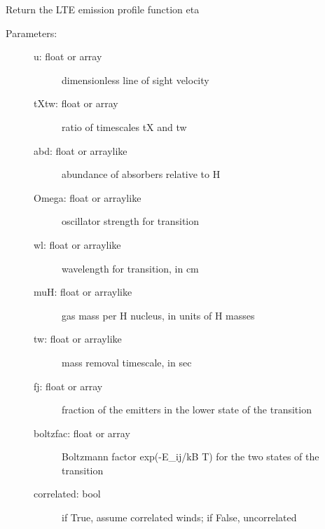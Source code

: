 \documentclass[letterpaper,10pt,english]{sphinxmanual}
\begin{document}
\begin{fulllineitems}
\begin{fulllineitems}
\begin{description}
\begin{description}
\end{description}

\end{description}

\end{fulllineitems}


\begin{fulllineitems}
\label{fulldoc:despotic.winds.pwind.eta}
Return the LTE emission profile function eta
\begin{description}
\item[{Parameters:}] \leavevmode\begin{description}
\item[{u: float or array}] \leavevmode
dimensionless line of sight velocity

\item[{tXtw: float or array}] \leavevmode
ratio of timescales tX and tw

\item[{abd: float or arraylike}] \leavevmode
abundance of absorbers relative to H

\item[{Omega: float or arraylike}] \leavevmode
oscillator strength for transition

\item[{wl: float or arraylike}] \leavevmode
wavelength for transition, in cm

\item[{muH: float or arraylike}] \leavevmode
gas mass per H nucleus, in units of H masses

\item[{tw: float or arraylike}] \leavevmode
mass removal timescale, in sec

\item[{fj: float or array}] \leavevmode
fraction of the emitters in the lower state of the
transition

\item[{boltzfac: float or array}] \leavevmode
Boltzmann factor exp(-E\_ij/kB T) for the two states of
the transition

\item[{correlated: bool}] \leavevmode
if True, assume correlated winds; if False, uncorrelated


\end{description}
\end{description}
\end{fulllineitems}
\end{fulllineitems}
\end{document}
